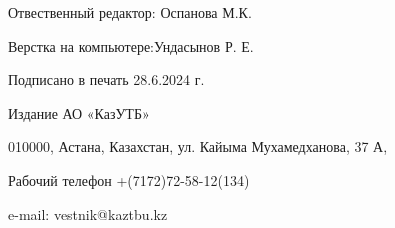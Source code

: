 \newpage

\thispagestyle{empty}
\null
\vfill
\begin{center}
Отвественный редактор: Оспанова М.К.

Верстка на компьютере:Ундасынов Р. Е.

Подписано в печать 28.6.2024 г.

Издание АО «КазУТБ»

010000, Астана, Казахстан, ул. Кайыма Мухамедханова, 37 А,

Рабочий телефон +(7172)72-58-12(134)

e-mail: vestnik@kaztbu.kz
\end{center}
\vfill
\null
